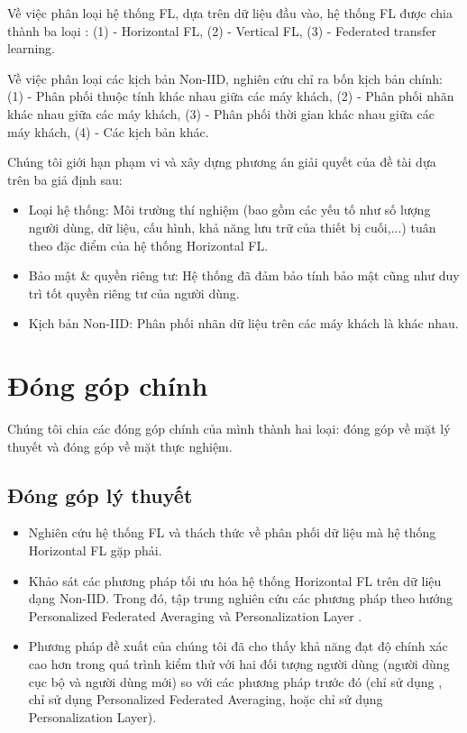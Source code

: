Về việc phân loại hệ thống FL, dựa trên dữ liệu đầu vào, hệ thống FL được chia thành ba loại \cite{yin2021comprehensive}: (1) - Horizontal FL, (2) - Vertical FL, (3) - Federated transfer learning.

Về việc phân loại các kịch bản Non-IID, nghiên cứu \cite{zhu2021federated} chỉ ra bốn kịch bản chính: (1) - Phân phối thuộc tính khác nhau giữa các máy khách, (2) - Phân phối nhãn khác nhau giữa các máy khách, (3) - Phân phối thời gian khác nhau giữa các máy khách, (4) - Các kịch bản khác.

Chúng tôi giới hạn phạm vi và xây dựng phương án giải quyết của đề tài dựa trên ba giả định sau:

\begin{itemize}
    \item Loại hệ thống: Môi trường thí nghiệm (bao gồm các yếu tố như số lượng người dùng, dữ liệu, cấu hình, khả năng lưu trữ của thiết bị cuối,...) tuân theo đặc điểm của hệ thống Horizontal FL.
    \item Bảo mật \& quyền riêng tư: Hệ thống đã đảm bảo tính bảo mật cũng như duy trì tốt quyền riêng tư của người dùng.
    \item Kịch bản Non-IID: Phân phối nhãn dữ liệu trên các máy khách là khác nhau.
\end{itemize}

\section{Đóng góp chính}

Chúng tôi chia các đóng góp chính của mình thành hai loại: đóng góp về mặt lý thuyết và đóng góp về mặt thực nghiệm.

\subsection{Đóng góp lý thuyết}

\begin{itemize}
    \item Nghiên cứu hệ thống FL và thách thức về phân phối dữ liệu mà hệ thống Horizontal FL gặp phải.
    \item Khảo sát các phương pháp tối ưu hóa hệ thống Horizontal FL trên dữ liệu dạng Non-IID. Trong đó, tập trung nghiên cứu các phương pháp theo hướng Personalized Federated Averaging \parencite{fallah2020personalized, chen2018federated} và Personalization Layer \parencite{liang2020think, arivazhagan2019federated}.
    \item Phương pháp đề xuất của chúng tôi đã cho thấy khả năng đạt độ chính xác cao hơn trong quá trình kiểm thử với hai đối tượng người dùng (người dùng cục bộ và người dùng mới) so với các phương pháp trước đó (chỉ sử dụng , chỉ sử dụng Personalized Federated Averaging, hoặc chỉ sử dụng Personalization Layer).
\end{itemize}

